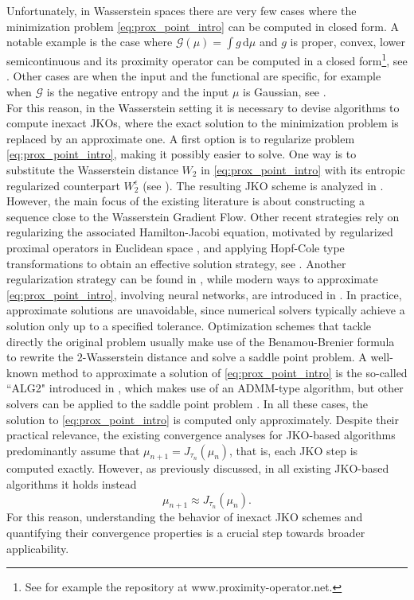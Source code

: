 \documentclass[11pt]{article}
\newcommand{\cG}{\mathcal{G}}
\numberwithin{equation}{section}
\begin{document}
Unfortunately, in Wasserstein spaces there are very few cases where the minimization problem \eqref{eq:prox_point_intro} can be computed in closed form. A notable example is the case where $\mathcal{\cG}(\mu) = \int g \, \mathrm{d}\mu$ and $g$ is proper, convex, lower semicontinuous and its proximity operator can be computed in a closed form\footnote{See for example the repository at www.proximity-operator.net.}, see \cite{Bowles15}. Other cases are when the input and the functional are specific, for example when $\mathcal{G}$ is the negative entropy and the input $\mu$ is Gaussian, see \cite[Example 8]{Wibisono18}.\\
For this reason, in the Wasserstein setting it is necessary to devise algorithms to compute inexact JKOs, where the exact solution to the minimization problem is replaced by an approximate one. A first option is to regularize problem \eqref{eq:prox_point_intro}, making it possibly easier to solve. One way is to substitute the Wasserstein distance $W_2$ in \eqref{eq:prox_point_intro} with its entropic regularized counterpart $W_2^\epsilon$ (see \cite{Leonard14,KS67}). The resulting JKO scheme is analyzed in \cite{CDPS17}. However, the main focus of the existing literature is about constructing a sequence close to the Wasserstein Gradient Flow. Other recent strategies rely on regularizing the associated Hamilton-Jacobi equation, motivated by regularized proximal operators in Euclidean space \cite{OHW23,HWO24}, and applying Hopf-Cole type transformations to obtain an effective solution strategy, see \cite{LLO23}. Another regularization strategy can be found in \cite{LLW20}, while modern ways to approximate \eqref{eq:prox_point_intro}, involving neural networks, are introduced in \cite{LWL24}. In practice, approximate solutions are unavoidable, since numerical solvers typically achieve a solution only up to a specified tolerance. Optimization schemes that tackle directly the original problem usually make use of the Benamou-Brenier formula \cite{BB2000} to rewrite the $2$-Wasserstein distance and solve a saddle point problem. A well-known method to approximate a solution of \eqref{eq:prox_point_intro} is the so-called ``ALG2" introduced in \cite{BCL16}, which makes use of an ADMM-type algorithm, but other solvers can be applied to the saddle point problem \cite{Chambolle2011}. In all these cases, the solution to \eqref{eq:prox_point_intro} is computed only approximately. Despite their practical relevance, the existing convergence analyses for JKO-based algorithms predominantly assume that $\mu_{n+1}=J_{\tau_n}(\mu_n)$, that is, each JKO step is computed exactly. However, as previously discussed, in all existing JKO-based algorithms it holds instead \[\mu_{n+1}\approx J_{\tau_n}(\mu_n).\]
For this reason, understanding the behavior of inexact JKO schemes and quantifying their convergence properties is a crucial step towards broader applicability. 
\end{document}
